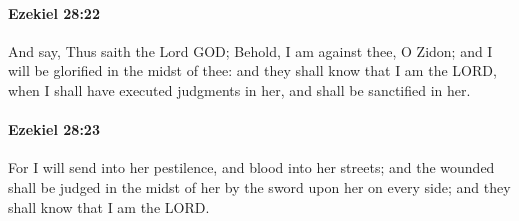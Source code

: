 		\paragraph{Ezekiel 28:22} %
			\label{EZEKIEL-28-22}

			And say, Thus saith the Lord GOD; Behold, I am against thee, O Zidon; and I will be glorified in the midst of thee: and they shall know that I am the LORD, when I shall have executed judgments in her, and shall be sanctified in her.


		\paragraph{Ezekiel 28:23} %
			\label{EZEKIEL-28-23}

			For I will send into her pestilence, and blood into her streets; and the wounded shall be judged in the midst of her by the sword upon her on every side; and they shall know that I am the LORD.

